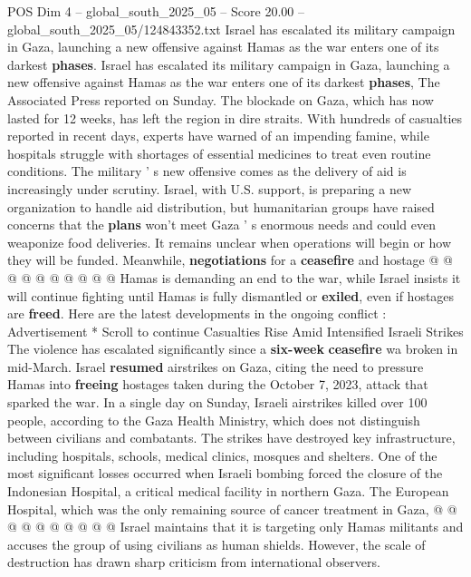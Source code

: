 \begin{textsample}{POS Dim 4 – global\_south\_2025\_05 – Score 20.00 – global\_south\_2025\_05/124843352.txt}  \label{ex:f4_pos_100}
Israel has escalated its military campaign in Gaza, launching a new offensive against Hamas as the war enters one of its darkest \textbf{phases}.
Israel has escalated its military campaign in Gaza, launching a new offensive against Hamas as the war enters one of its darkest \textbf{phases}, The Associated Press reported on Sunday.
The blockade on Gaza, which has now lasted for 12 weeks, has left the region in dire straits.
With hundreds of casualties reported in recent days, experts have warned of an impending famine, while hospitals struggle with shortages of essential medicines to treat even routine conditions.
The military ' s new offensive comes as the delivery of aid is increasingly under scrutiny.
Israel, with U.S. support, is preparing a new organization to handle aid distribution, but humanitarian groups have raised concerns that the \textbf{plans} won't meet Gaza ' s enormous needs and could even weaponize food deliveries.
It remains unclear when operations will begin or how they will be funded.
Meanwhile, \textbf{negotiations} for a \textbf{ceasefire} and hostage @ @ @ @ @ @ @ @ @ @ Hamas is demanding an end to the war, while Israel insists it will continue fighting until Hamas is fully dismantled or \textbf{exiled}, even if hostages are \textbf{freed}.
Here are the latest developments in the ongoing conflict : Advertisement * Scroll to continue Casualties Rise Amid Intensified Israeli Strikes The violence has escalated significantly since a \textbf{six-week} \textbf{ceasefire} wa broken in mid-March.
Israel \textbf{resumed} airstrikes on Gaza, citing the need to pressure Hamas into \textbf{freeing} hostages taken during the October 7, 2023, attack that sparked the war.
In a single day on Sunday, Israeli airstrikes killed over 100 people, according to the Gaza Health Ministry, which does not distinguish between civilians and combatants.
The strikes have destroyed key infrastructure, including hospitals, schools, medical clinics, mosques and shelters.
One of the most significant losses occurred when Israeli bombing forced the closure of the Indonesian Hospital, a critical medical facility in northern Gaza.
The European Hospital, which was the only remaining source of cancer treatment in Gaza, @ @ @ @ @ @ @ @ @ @ Israel maintains that it is targeting only Hamas militants and accuses the group of using civilians as human shields.
However, the scale of destruction has drawn sharp criticism from international observers.

\end{textsample}
